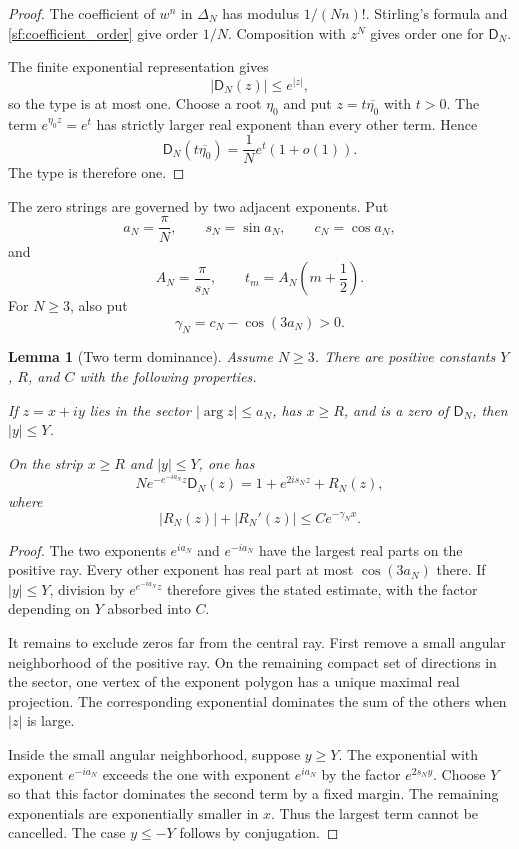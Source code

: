 \documentclass{aomart}
\newtheorem{lemma}[lemma]{Lemma}
\theoremstyle{definition}
\theoremstyle{remark}
\newcommand{\Dfun}{\mathsf D}
\begin{document}
\begin{proof}
The coefficient of $w^n$ in $\Delta_N$ has modulus $1/(Nn)!$.  Stirling's formula and \cref{sf:coefficient_order} give order $1/N$.  Composition with $z^N$ gives order one for $\Dfun_N$.

The finite exponential representation gives
\[
|\Dfun_N(z)|\leq e^{|z|},
\]
so the type is at most one.  Choose a root $\eta_0$ and put $z=t\overline{\eta_0}$ with $t>0$.  The term $e^{\eta_0z}=e^t$ has strictly larger real exponent than every other term.  Hence
\[
\Dfun_N(t\overline{\eta_0})
=
\frac1Ne^t(1+o(1)).
\]
The type is therefore one.
\end{proof}

The zero strings are governed by two adjacent exponents.  Put
\[
a_N=\frac\pi N,
\qquad
s_N=\sin a_N,
\qquad
c_N=\cos a_N,
\]
and
\[
A_N=\frac\pi{s_N},
\qquad
 t_m=A_N\left(m+\frac12\right).
\]
For $N\geq3$, also put
\[
\gamma_N=c_N-\cos(3a_N)>0.
\]

\begin{lemma}[Two term dominance]\label{lem:two_term_dominance}
Assume $N\geq3$.  There are positive constants $Y$, $R$, and $C$ with the following properties.

If $z=x+iy$ lies in the sector $|\arg z|\leq a_N$, has $x\geq R$, and is a zero of $\Dfun_N$, then $|y|\leq Y$.

On the strip $x\geq R$ and $|y|\leq Y$, one has
\[
N e^{-e^{-ia_N}z}\Dfun_N(z)
=
1+e^{2is_Nz}+R_N(z),
\]
where
\[
|R_N(z)|+|R_N'(z)|
\leq
C e^{-\gamma_Nx}.
\]
\end{lemma}

\begin{proof}
The two exponents $e^{ia_N}$ and $e^{-ia_N}$ have the largest real parts on the positive ray.  Every other exponent has real part at most $\cos(3a_N)$ there.  If $|y|\leq Y$, division by $e^{e^{-ia_N}z}$ therefore gives the stated estimate, with the factor depending on $Y$ absorbed into $C$.

It remains to exclude zeros far from the central ray.  First remove a small angular neighborhood of the positive ray.  On the remaining compact set of directions in the sector, one vertex of the exponent polygon has a unique maximal real projection.  The corresponding exponential dominates the sum of the others when $|z|$ is large.

Inside the small angular neighborhood, suppose $y\geq Y$.  The exponential with exponent $e^{-ia_N}$ exceeds the one with exponent $e^{ia_N}$ by the factor $e^{2s_Ny}$.  Choose $Y$ so that this factor dominates the second term by a fixed margin.  The remaining exponentials are exponentially smaller in $x$.  Thus the largest term cannot be cancelled.  The case $y\leq-Y$ follows by conjugation.
\end{proof}
\end{document}
